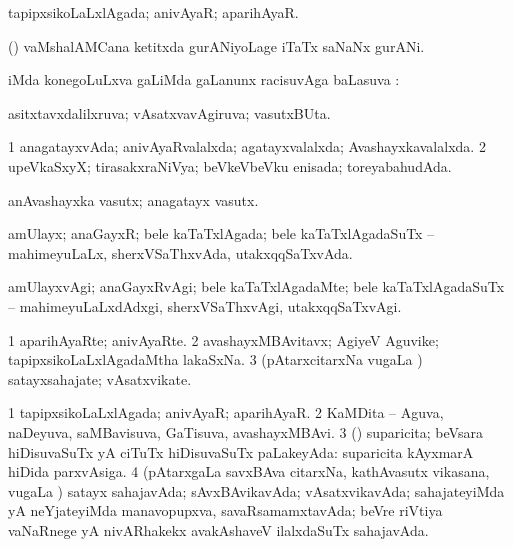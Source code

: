 \bentry
{}
\gl{\gu}
\bmng
tapipxsikoLaLxlAgada; anivAyaR; aparihAyaR. 
\emng
\eentry

\bentry
{}
\gl{\nA}
\bmng
(\vaMlAM) vaMshalAMCana ketitxda gurANiyoLage iTaTx saNaNx gurANi. 
\emng
\eentry

\bentry
{}
\gl{\uparx}
\bmng
{} iMda konegoLuLxva \gu gaLiMda \nA gaLanunx racisuvAga baLasuva \uparx:  
\emng
\eentry

\bentry
{}
\gl{\gu}
\expl{\Latin }
\bmng
asitxtavxdalilxruva; vAsatxvavAgiruva; vasutxBUta. 
\emng
\eentry

\bentry
{}
\gl{\gu}
\bmng
\bnum
\num{1} anagatayxvAda; anivAyaRvalalxda; agatayxvalalxda; Avashayxkavalalxda. 
\num{2} upeVkaSxyX; tirasakxraNiVya; beVkeVbeVku enisada; toreyabahudAda. 
\enum
\emng
\eentry

\bentry
{}
\gl{\nA}
\bmng
anAvashayxka vasutx; anagatayx vasutx. 
\emng
\eentry

\bentry
{}
\gl{\gu}
\bmng
amUlayx; anaGayxR; bele kaTaTxlAgada; bele kaTaTxlAgadaSuTx -- mahimeyuLaLx, sherxVSaThxvAda, utakxqqSaTxvAda. 
\emng
\eentry

\bentry
{}
\gl{\kirxvi}
\bmng
amUlayxvAgi; anaGayxRvAgi; bele kaTaTxlAgadaMte; bele kaTaTxlAgadaSuTx -- mahimeyuLaLxdAdxgi, sherxVSaThxvAgi, utakxqqSaTxvAgi. 
\emng
\eentry

\bentry
{}
\gl{\nA}
\bmng
\bnum
\num{1} aparihAyaRte; anivAyaRte. 
\num{2} avashayxMBAvitavx; AgiyeV Aguvike; tapipxsikoLaLxlAgadaMtha lakaSxNa. 
\num{3} (pAtarxcitarxNa \mo vugaLa \vi) satayxsahajate; vAsatxvikate. 
\enum
\emng
\eentry

\bentry
{}
\gl{\gu}
\bmng
\bnum
\num{1} tapipxsikoLaLxlAgada; anivAyaR; aparihAyaR. 
\num{2} KaMDita -- Aguva, naDeyuva, saMBavisuva, GaTisuva, avashayxMBAvi. 
\num{3} (\AmA) suparicita; beVsara hiDisuvaSuTx yA ciTuTx hiDisuvaSuTx paLakeyAda:  suparicita kAyxmarA hiDida parxvAsiga. 
\num{4} (pAtarxgaLa savxBAva citarxNa, kathAvasutx vikasana, \mo vugaLa \vi) satayx sahajavAda; sAvxBAvikavAda; vAsatxvikavAda; sahajateyiMda yA neYjateyiMda manavopupxva, savaRsamamxtavAda; beVre riVtiya vaNaRnege yA nivARhakekx avakAshaveV ilalxdaSuTx sahajavAda. 
\enum
\emng
\eentry

